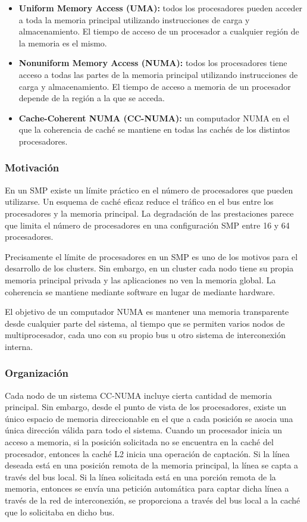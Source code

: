 \begin{itemize}
  \item \textbf{Uniform Memory Access (UMA):} todos los procesadores pueden acceder a toda la memoria principal utilizando instrucciones de carga y almacenamiento. El tiempo de acceso de un procesador a cualquier región de la memoria es el mismo.
  \item \textbf{Nonuniform Memory Access (NUMA):} todos los procesadores tiene acceso a todas las partes de la memoria principal utilizando instrucciones de carga y almacenamiento. El tiempo de acceso a memoria de un procesador depende de la región a la que se acceda.   
  \item \textbf{Cache-Coherent NUMA (CC-NUMA):} un computador NUMA en el que la coherencia de caché se mantiene en todas las cachés de los distintos procesadores.
\end{itemize}

\subsubsection*{Motivación}

En un SMP existe un límite práctico en el número de procesadores que pueden utilizarse. Un esquema de caché eficaz reduce el tráfico en el bus entre los procesadores y la memoria principal. La degradación de las prestaciones parece que limita el número de procesadores en una configuración SMP entre 16 y 64 procesadores.

Precisamente el límite de procesadores en un SMP es uno de los motivos para el desarrollo de los clusters. Sin embargo, en un cluster cada nodo tiene su propia memoria principal privada y las aplicaciones no ven la memoria global. La coherencia se mantiene mediante software en lugar de mediante hardware.

El objetivo de un computador NUMA es mantener una memoria transparente desde cualquier parte del sistema, al tiempo que se permiten varios nodos de multiprocesador, cada uno con su propio bus u otro sistema de interconexión interna.

\subsubsection*{Organización}

Cada nodo de un sistema CC-NUMA incluye cierta cantidad de memoria principal. Sin embargo, desde el punto de vista de los procesadores, existe un único espacio de memoria direccionable en el que a cada posición se asocia una única dirección válida para todo el sistema. Cuando un procesador inicia un acceso a memoria, si la posición solicitada no se encuentra en la caché del procesador, entonces la caché L2 inicia una operación de captación. Si la línea deseada está en una posición remota de la memoria principal, la línea se capta a través del bus local. Si la línea solicitada está en una porción remota de la memoria, entonces se envía una petición automática para captar dicha línea a través de la red de interconexión, se proporciona a través del bus local a la caché que lo solicitaba en dicho bus.

